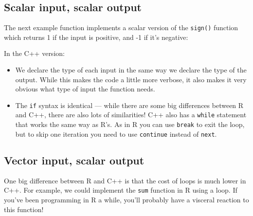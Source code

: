 \subsection{Scalar input, scalar output}

The next example function implements a scalar version of the
\texttt{sign()} function which returns 1 if the input is positive, and
-1 if it's negative:

\begin{Shaded}
\begin{Highlighting}[]
\StringTok{ }
  \StringTok{ }\NormalTok{) \{}
  \StringTok{ }\NormalTok{) \{}
    \NormalTok{-}
  \NormalTok{\}}
\NormalTok{\}}

\NormalTok{(}
\StringTok{  \}}
\NormalTok{)}
\end{Highlighting}
\end{Shaded}

In the C++ version:

\begin{itemize}
\item
  We declare the type of each input in the same way we declare the type
  of the output. While this makes the code a little more verbose, it
  also makes it very obvious what type of input the function needs.
\item
  The \texttt{if} syntax is identical --- while there are some big
  differences between R and C++, there are also lots of similarities!
  C++ also has a \texttt{while} statement that works the same way as
  R's. As in R you can use \texttt{break} to exit the loop, but to skip
  one iteration you need to use \texttt{continue} instead of
  \texttt{next}.
\end{itemize}

\subsection{Vector input, scalar output}

One big difference between R and C++ is that the cost of loops is much
lower in C++. For example, we could implement the \texttt{sum} function
in R using a loop. If you've been programming in R a while, you'll
probably have a visceral reaction to this function!

